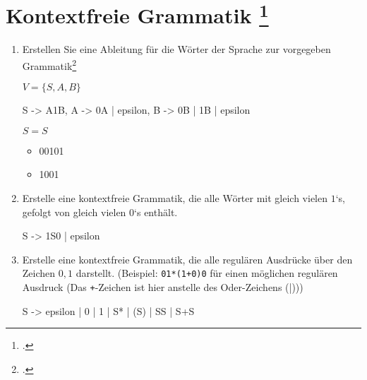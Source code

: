 \documentclass{lehramt-informatik-aufgabe}
\begin{document}
\section{Kontextfreie Grammatik
\footcite{theo:fs:2}}

\begin{enumerate}
\item Erstellen Sie eine Ableitung für die Wörter der Sprache zur
vorgegeben Grammatik\footcite[Seite 10]{theo:fs:2}

$V = \{ S, A, B \}$


\begin{liProduktionsRegeln}
S -> A1B,
A -> 0A | epsilon,
B -> 0B | 1B | epsilon
\end{liProduktionsRegeln}

$S = S$

\begin{itemize}
\item 00101

\begin{liAntwort}
\end{liAntwort}

\item 1001

\begin{liAntwort}
\end{liAntwort}
\end{itemize}

\item Erstelle eine kontextfreie Grammatik, die alle Wörter mit gleich
vielen $1$‘s, gefolgt von gleich vielen $0$‘s enthält.

\begin{liAntwort}
\begin{liProduktionsRegeln}
S -> 1S0 | epsilon
\end{liProduktionsRegeln}
\end{liAntwort}

\item Erstelle eine kontextfreie Grammatik, die alle regulären Ausdrücke
über den Zeichen $0,1$ darstellt.
(Beispiel: \texttt{01*(1+0)0} für einen möglichen regulären Ausdruck
(Das \texttt{+}-Zeichen ist hier anstelle des Oder-Zeichens (|)))

\begin{liAntwort}

\begin{liProduktionsRegeln}
S -> epsilon | 0 | 1 | S* | (S) | SS | S+S
\end{liProduktionsRegeln}
\end{liAntwort}

\end{enumerate}
\end{document}

